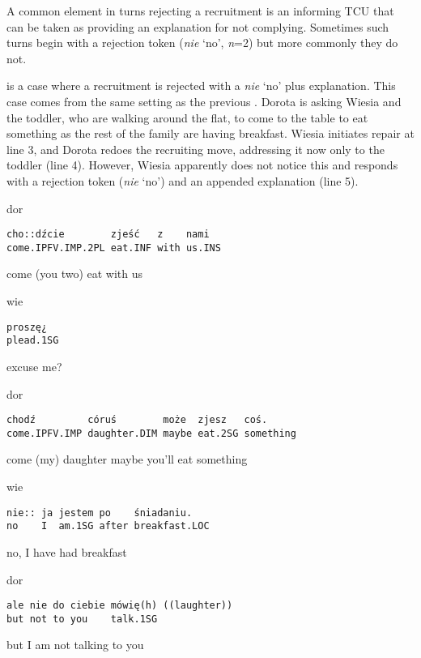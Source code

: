 \documentclass[output=paper]{langsci/langscibook}
\begin{document}
A common element in turns rejecting a recruitment is an informing TCU that can be taken as providing an explanation for not complying.  Sometimes such turns begin with a rejection token (\textit{nie} `no', \textit{n}=2) but more commonly they do not.

 is a case where a recruitment is rejected with a \textit{nie} `no' plus explanation.  This case comes from the same setting as the previous .  Dorota is asking Wiesia and the toddler, who are walking around the flat, to come to the table to eat something  as the rest of the family are having breakfast.  Wiesia initiates repair at line 3, and Dorota redoes the recruiting move, addressing it now only to the toddler (line 4).  However, Wiesia apparently does not notice this and responds with a rejection token (\textit{nie} `no') and an appended explanation (line 5).

\vspace{-1mm}
%
\begin{mdframednoverticalspace}[style=firstfoc]
\begin{transbox}{1}{dor}
\begin{verbatim}
cho::dźcie        zjeść   z    nami
come.IPFV.IMP.2PL eat.INF with us.INS
\end{verbatim}
 come (you two) eat with us
\end{transbox}
\end{mdframednoverticalspace}
%
%
\begin{mdframednoverticalspace}[style=secondfoc]
\begin{transbox}{3}{wie}
\begin{verbatim}
proszę¿
plead.1SG
\end{verbatim}
excuse me?
\end{transbox}
\end{mdframednoverticalspace}
%
\begin{mdframednoverticalspace}[style=firstfoc]
\begin{transbox}{4}{dor}
\begin{verbatim}
chodź         córuś        może  zjesz   coś.
come.IPFV.IMP daughter.DIM maybe eat.2SG something
\end{verbatim}
come (my) daughter maybe you’ll eat something
\end{transbox}
\end{mdframednoverticalspace}
%
\begin{mdframednoverticalspace}[style=secondfoc]
\begin{transbox}{5}{wie}
\begin{verbatim}
nie:: ja jestem po    śniadaniu.
no    I  am.1SG after breakfast.LOC
\end{verbatim}
no, I have had breakfast
\end{transbox}
\end{mdframednoverticalspace}
%
\begin{transbox}{6}{dor}
\begin{verbatim}
ale nie do ciebie mówię(h) ((laughter))
but not to you    talk.1SG
\end{verbatim}
but I am not talking to you
\end{transbox}\bigskip
\end{document}
